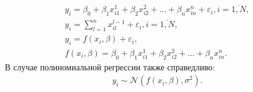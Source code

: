 \begin{equation}
    \begin{array}{c}
        \label{eq28}y_i=\beta_0+\beta_1 x_{i1}^1+\beta_2 x_{i2}^2+\dots+\beta_n x_{in}^n+\varepsilon_i, i=\overline{1,N},\\
        y_i = \sum\limits_{l=1}^{n} x_{il}^{l-1} + \varepsilon_i, i=\overline{1,N},\\
        y_i= f(x_i,\beta)+\varepsilon_i,\\
        f(x_i,\beta)=\beta_0+\beta_1 x_{i1}^1+\beta_2 x_{i2}^2+\dots+\beta_n x_{in}^n.
    \end{array}
\end{equation}
В случае полиномиальной регрессии также справедливо:
\begin{eqnarray}
    y_i\sim \mathcal{N}(f(x_i,\beta),\sigma^2).
\end{eqnarray}

